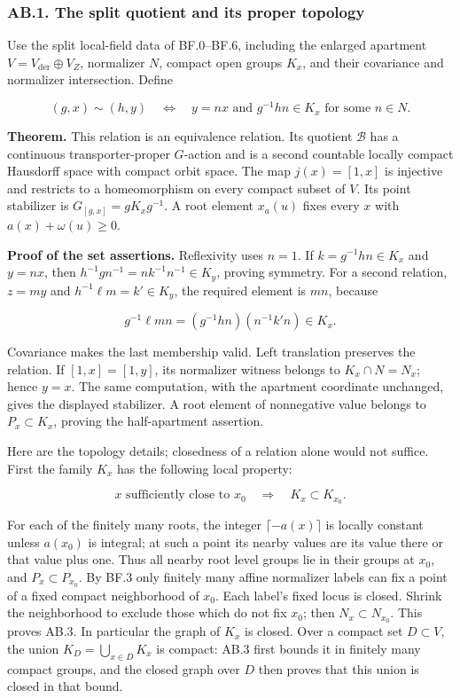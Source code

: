 \documentclass[
  11pt,
]{article}
\begin{document}
\subsubsection{AB.1. The split quotient and its proper
topology}\label{ab.1.-the-split-quotient-and-its-proper-topology}

Use the split local-field data of BF.0--BF.6, including the enlarged
apartment \(V=V_{\mathrm{der}}\oplus V_Z\), normalizer \(N\), compact
open groups \(K_x\), and their covariance and normalizer intersection.
Define

\[
 (g,x)\sim(h,y)
 \quad\Longleftrightarrow\quad
 y=nx\text{ and }g^{-1}hn\in K_x\text{ for some }n\in N.
 \tag{AB.2}
\]

\textbf{Theorem.} This relation is an equivalence relation. Its quotient
\(\mathcal B\) has a continuous transporter-proper \(G\)-action and is a
second countable locally compact Hausdorff space with compact orbit
space. The map \(j(x)=[1,x]\) is injective and restricts to a
homeomorphism on every compact subset of \(V\). Its point stabilizer is
\(G_{[g,x]}=gK_xg^{-1}\). A root element \(x_a(u)\) fixes every \(x\)
with \(a(x)+\omega(u)\ge0\).

\textbf{Proof of the set assertions.} Reflexivity uses \(n=1\). If
\(k=g^{-1}hn\in K_x\) and \(y=nx\), then
\(h^{-1}gn^{-1}=nk^{-1}n^{-1}\in K_y\), proving symmetry. For a second
relation, \(z=my\) and \(h^{-1}\ell m=k'\in K_y\), the required element
is \(mn\), because

\[
 g^{-1}\ell mn=(g^{-1}hn)(n^{-1}k'n)\in K_x.
\]

Covariance makes the last membership valid. Left translation preserves
the relation. If \([1,x]=[1,y]\), its normalizer witness belongs to
\(K_x\cap N=N_x\); hence \(y=x\). The same computation, with the
apartment coordinate unchanged, gives the displayed stabilizer. A root
element of nonnegative value belongs to \(P_x\subset K_x\), proving the
half-apartment assertion.

Here are the topology details; closedness of a relation alone would not
suffice. First the family \(K_x\) has the following local property:

\[
 x\text{ sufficiently close to }x_0\quad\Longrightarrow\quad K_x\subset K_{x_0}.
 \tag{AB.3}
\]

For each of the finitely many roots, the integer \(\lceil-a(x)\rceil\)
is locally constant unless \(a(x_0)\) is integral; at such a point its
nearby values are its value there or that value plus one. Thus all
nearby root level groups lie in their groups at \(x_0\), and
\(P_x\subset P_{x_0}\). By BF.3 only finitely many affine normalizer
labels can fix a point of a fixed compact neighborhood of \(x_0\). Each
label's fixed locus is closed. Shrink the neighborhood to exclude those
which do not fix \(x_0\); then \(N_x\subset N_{x_0}\). This proves AB.3.
In particular the graph of \(K_x\) is closed. Over a compact set
\(D\subset V\), the union \(K_D=\bigcup_{x\in D}K_x\) is compact: AB.3
first bounds it in finitely many compact groups, and the closed graph
over \(D\) then proves that this union is closed in that bound.
\end{document}
